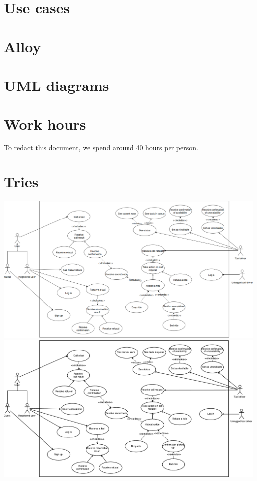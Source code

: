 \begin{appendices}
\chapter{Use cases}


\chapter{Alloy}


\chapter{UML diagrams}


\chapter{Work hours}
To redact this document, we spend around 40 hours per person.

\chapter{Tries}
\begin{landscape}
    \includegraphics[width=850pt, keepaspectratio]{files/index.png}
    \label{fig:PropProf}
	\includegraphics{files/use_case.pdf}
\end{landscape}
    

\label{fig:PropProf}


\end{appendices}

